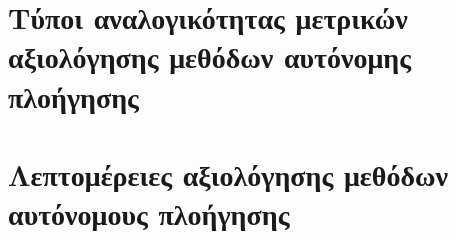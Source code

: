 \section{Τύποι αναλογικότητας μετρικών αξιολόγησης μεθόδων αυτόνομης πλοήγησης}
  \label{appendix:proportionality_contribution}
  

\section{Λεπτομέρειες αξιολόγησης μεθόδων αυτόνομους πλοήγησης}
  \label{appendix:evaluation_details}
  
